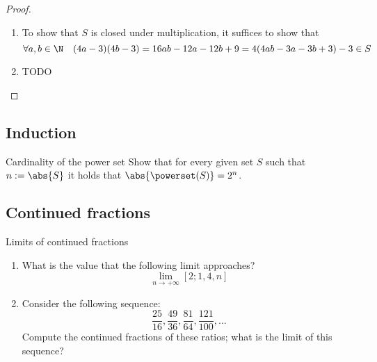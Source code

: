 \documentclass[a4paper, 12pt]{report}
\begin{document}
    \begin{proof}
        \quad
        \begin{enumerate}
            \item To show that $S$ is closed under multiplication, it suffices to show that $$\forall a, b \in \N \quad (4a -3)(4b- 3) = 16ab -12a -12b +9 = 4(4ab - 3a -3b +3) - 3 \in S$$
            \item TODO
        \end{enumerate}
    \end{proof}

    \subsection{Induction}

    \begin{framedprob}{Cardinality of the power set}
        Show that for every given set $S$ such that $n := \abs{S}$ it holds that $\abs{\powerset(S)} = 2^n$.
    \end{framedprob}


    \subsection{Continued fractions}

    \begin{framedprob}{Limits of continued fractions}
        \begin{enumerate}
            \item What is the value that the following limit approaches? $$\lim_{n \to + \infty}{[2; 1, 4, n]}$$
            \item Consider the following sequence: $$\dfrac{25}{16}, \dfrac{49}{36}, \dfrac{81}{64}, \dfrac{121}{100}, \ldots$$ Compute the continued fractions of these ratios; what is the limit of this sequence?
        \end{enumerate}
    \end{framedprob}
\end{document}
